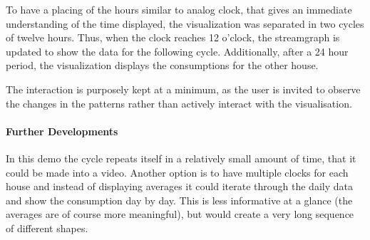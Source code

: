 \documentclass[a4paper,12pt,twoside]{article}
\begin{document}
To have a placing of the hours similar to analog clock, that gives an immediate understanding of the time displayed, the visualization was separated in two cycles of twelve hours. Thus, when the clock reaches 12 o'clock, the streamgraph is updated to show the data for the following cycle.
Additionally, after a 24 hour period, the visualization displays the consumptions for the other house.

The interaction is purposely kept at a minimum, as the user is invited to observe the changes in the patterns rather than actively interact with the visualisation.
\paragraph{Further Developments} In this demo the cycle repeats itself in a relatively small amount of time, that it could be made into a video. Another option is to have multiple clocks for each house and instead of displaying averages it could iterate through the daily data and show the consumption day by day. This is less informative at a glance (the averages are of course more meaningful), but would create a very long sequence of different shapes.
\end{document}
